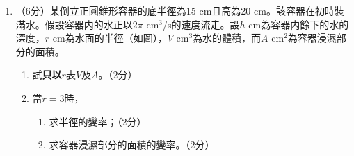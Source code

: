 \documentclass[12pt]{article}
\begin{document}
\begin{enumerate}
        \hrulefill

        \hrulefill

        \hrulefill

        \hrulefill

        \hrulefill

        \hrulefill

        \hrulefill

        \hrulefill

        \item （6分）某倒立正圓錐形容器的底半徑為15 cm且高為20 cm。該容器在初時裝滿水。假設容器内的水正以$2\pi$ cm$^3$/s的速度流走。設$h$ cm為容器内餘下的水的深度，$r$ cm為水面的半徑（如圖），$V$ cm$^3$為水的體積，而$A$ cm$^2$為容器浸濕部分的面積。\begin{enumerate}
            \item 試\textbf{只以}$r$表$V$及$A$。\hfill（2分）
            \item 當$r=3$時，\begin{enumerate}
                \item 求半徑的變率；\hfill（2分）
                \item 求容器浸濕部分的面積的變率。\hfill（2分）
            \end{enumerate}
        \end{enumerate}

        \hrulefill

        \hrulefill

        \hrulefill

        \hrulefill

        \hrulefill

        \hrulefill

        \hrulefill

        \hrulefill

        \hrulefill

        \hrulefill

        \hrulefill

        \hrulefill

        \hrulefill

        \hrulefill

        \hrulefill

        \hrulefill

        \hrulefill

        \hrulefill

        \hrulefill

        \hrulefill


\end{enumerate}
\end{document}
